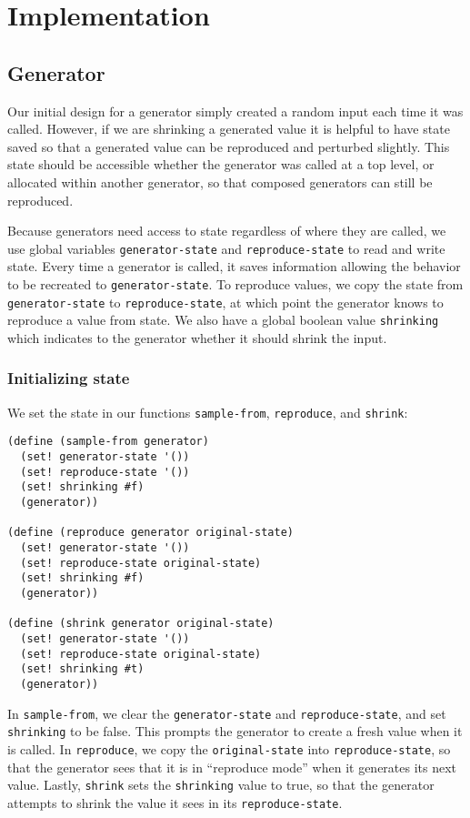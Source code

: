 
\section{Implementation}

\subsection{Generator}

Our initial design for a generator simply created a random input each time it was called. However, if we are shrinking a generated value it is helpful to have state saved so that a generated value can be reproduced and perturbed slightly. This state should be accessible whether the generator was called at a top level, or allocated within another generator, so that composed generators can still be reproduced.

Because generators need access to state regardless of where they are called, we use global variables \verb|generator-state| and \verb|reproduce-state| to read and write state. Every time a generator is called, it saves information allowing the behavior to be recreated to \verb|generator-state|. To reproduce values, we copy the state from \verb|generator-state| to \verb|reproduce-state|, at which point the generator knows to reproduce a value from state. We also have a global boolean value \verb|shrinking| which indicates to the generator whether it should shrink the input.

\subsubsection{Initializing state}

We set the state in our functions \verb|sample-from|, \verb|reproduce|, and \verb|shrink|:
\begin{lstlisting}
(define (sample-from generator)
  (set! generator-state '())
  (set! reproduce-state '())
  (set! shrinking #f)
  (generator))

(define (reproduce generator original-state)
  (set! generator-state '())
  (set! reproduce-state original-state)
  (set! shrinking #f)
  (generator))

(define (shrink generator original-state)
  (set! generator-state '())
  (set! reproduce-state original-state)
  (set! shrinking #t)
  (generator))
\end{lstlisting}
In \verb|sample-from|, we clear the \verb|generator-state| and \verb|reproduce-state|, and set \verb|shrinking| to be false. This prompts the generator to create a fresh value when it is called. In \verb|reproduce|, we copy the \verb|original-state| into \verb|reproduce-state|, so that the generator sees that it is in ``reproduce mode'' when it generates its next value. Lastly, \verb|shrink| sets the \verb|shrinking| value to true, so that the generator attempts to shrink the value it sees in its \verb|reproduce-state|.

